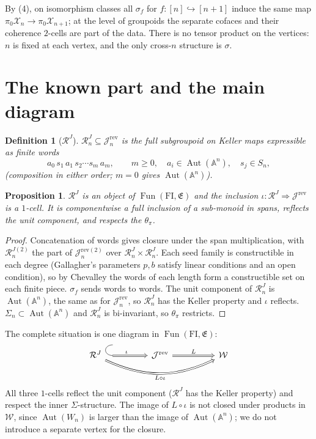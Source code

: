 \documentclass[11pt]{article}
\theoremstyle{change}
\newtheorem{definition}[equation]{Definition}
\newtheorem{prop}[equation]{Proposition}
\theoremstyle{nonumberplain}
\newtheorem{proof}{Proof}
\renewcommand\AA{{\mathbb A}}
\newcommand\cJ{{\mathcal J}}
\newcommand\cW{{\mathcal W}}
\newcommand\cR{{\mathcal R}}
\newcommand\cX{{\mathcal X}}
\newcommand\fE{{\mathfrak E}}
\newcommand\mono{\hookrightarrow}
\newcommand\rev{{\mathrm{rev}}}
\newcommand\FI{{\mathrm{FI}}}
\DeclareMathOperator{\Aut}{Aut}
\DeclareMathOperator{\Fun}{Fun}
\begin{document}
By (4), on isomorphism classes all $\sigma_f$ for $f : [n] \mono [n+1]$ induce the same map $\pi_0 \cX_n \to \pi_0 \cX_{n+1}$; at the level of groupoids the separate cofaces and their coherence $2$-cells are part of the data. There is no tensor product on the vertices: $n$ is fixed at each vertex, and the only cross-$n$ structure is $\sigma$.

\section{The known part and the main diagram\label{known}}

\begin{definition}[$\cR^J$]
$\cR^J_n \subseteq \cJ^\rev_n$ is the full subgroupoid on Keller maps expressible as finite words
\begin{equation*}
a_0 \, s_1 \, a_1 \, s_2 \cdots s_m \, a_m, \qquad m \geq 0, \quad a_i \in \Aut(\AA^n), \quad s_j \in S_n,
\end{equation*}
(composition in either order; $m = 0$ gives $\Aut(\AA^n)$).
\end{definition}

\begin{prop}
$\cR^J$ is an object of $\Fun(\FI, \fE)$ and the inclusion $\iota : \cR^J \Rightarrow \cJ^\rev$ is a $1$-cell. It is componentwise a full inclusion of a sub-monoid in spans, reflects the unit component, and respects the $\theta_\pi$.
\end{prop}

\begin{proof}
Concatenation of words gives closure under the span multiplication, with $\cR^{J(2)}_n$ the part of $\cJ^{\rev(2)}_n$ over $\cR^J_n \times \cR^J_n$. Each seed family is constructible in each degree (Gallagher's parameters $p, b$ satisfy linear conditions and an open condition), so by Chevalley the words of each length form a constructible set on each finite piece. $\sigma_f$ sends words to words. The unit component of $\cR^J_n$ is $\Aut(\AA^n)$, the same as for $\cJ^\rev_n$, so $\cR^J_n$ has the Keller property and $\iota$ reflects. $\Sigma_n \subset \Aut(\AA^n)$ and $\cR^J_n$ is bi-invariant, so $\theta_\pi$ restricts.
\end{proof}

The complete situation is one diagram in $\Fun(\FI, \fE)$:
\begin{equation}\label{maindiag}
\begin{tikzcd}[column sep=5em]
\cR^J \arrow[r, Rightarrow, hook, "\iota"]
  \arrow[rr, Rightarrow, bend right=25, "L\circ\iota"']
  & \cJ^{\rev} \arrow[r, Rightarrow, "L"]
  & \cW
\end{tikzcd}
\end{equation}
All three $1$-cells reflect the unit component ($\cR^J$ has the Keller property) and respect the inner $\Sigma$-structure. The image of $L \circ \iota$ is not closed under products in $\cW$, since $\Aut(W_n)$ is larger than the image of $\Aut(\AA^n)$; we do not introduce a separate vertex for the closure.
\end{document}
